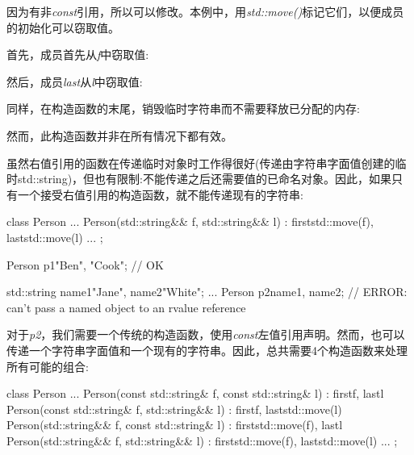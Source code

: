 
因为有非\textit{const}引用，所以可以修改。本例中，用\textit{std::move()}标记它们，以便成员的初始化可以窃取值。\par

首先，成员首先从\textit{f}中窃取值:\par


然后，成员\textit{last}从\textit{l}中窃取值:\par


同样，在构造函数的末尾，销毁临时字符串而不需要释放已分配的内存:\par


然而，此构造函数并非在所有情况下都有效。\par


虽然右值引用的函数在传递临时对象时工作得很好(传递由字符串字面值创建的临时std::string)，但也有限制:不能传递之后还需要值的已命名对象。因此，如果只有一个接受右值引用的构造函数，就不能传递现有的字符串:\par

\begin{codebox}[cpp]
class Person {
  ...
  Person(std::string&& f, std::string&& l)
  : first{std::move(f)}, last{std::move(l)} {
  }
  ...
};

Person p1{"Ben", "Cook"}; // OK

std::string name1{"Jane"}, name2{"White"};
...
Person p2{name1, name2}; // ERROR: can’t pass a named object to an rvalue reference
\end{codebox}

对于\textit{p2}，我们需要一个传统的构造函数，使用\textit{const}左值引用声明。然而，也可以传递一个字符串字面值和一个现有的字符串。因此，总共需要4个构造函数来处理所有可能的组合:\par

\begin{codebox}[cpp]
class Person {
  ...
  Person(const std::string& f, const std::string& l)
  : first{f}, last{l} {
  }
  Person(const std::string& f, std::string&& l)
  : first{f}, last{std::move(l)} {
  }
  Person(std::string&& f, const std::string& l)
  : first{std::move(f)}, last{l} {
  }
  Person(std::string&& f, std::string&& l)
  : first{std::move(f)}, last{std::move(l)} {
  }
  ...
};
\end{codebox}

